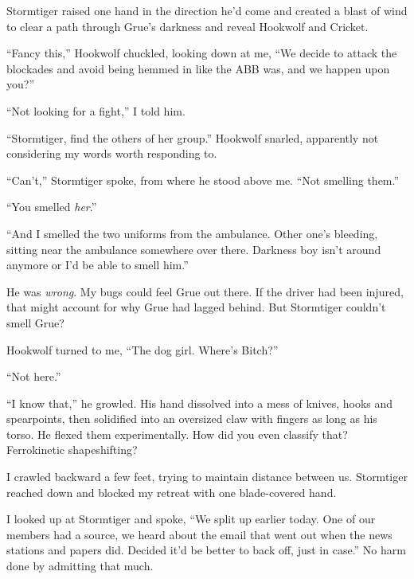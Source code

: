 





Stormtiger raised one hand in the direction he'd come and created a blast of wind to clear a path through Grue's darkness and reveal Hookwolf and Cricket.



``Fancy this,'' Hookwolf chuckled, looking down at me, ``We decide to attack the blockades and avoid being hemmed in like the ABB was, and we happen upon you?''



``Not looking for a fight,'' I told him.



``Stormtiger, find the others of her group.'' Hookwolf snarled, apparently not considering my words worth responding to.



``Can't,'' Stormtiger spoke, from where he stood above me.  ``Not smelling them.''



``You smelled \emph{her}.''



``And I smelled the two uniforms from the ambulance.  Other one's bleeding, sitting near the ambulance somewhere over there.  Darkness boy isn't around anymore or I'd be able to smell him.''



He was \emph{wrong}.  My bugs could feel Grue out there.  If the driver had been injured, that might account for why Grue had lagged behind.  But Stormtiger couldn't smell Grue?



Hookwolf turned to me, ``The dog girl.  Where's Bitch?''



``Not here.''



``I know that,'' he growled.  His hand dissolved into a mess of knives, hooks and spearpoints, then solidified into an oversized claw with fingers as long as his torso.  He flexed them experimentally.  How did you even classify that?  Ferrokinetic shapeshifting?



I crawled backward a few feet, trying to maintain distance between us.  Stormtiger reached down and blocked my retreat with one blade-covered hand.



I looked up at Stormtiger and spoke, ``We split up earlier today.  One of our members had a source, we heard about the email that went out when the news stations and papers did.  Decided it'd be better to back off, just in case.''  No harm done by admitting that much.



